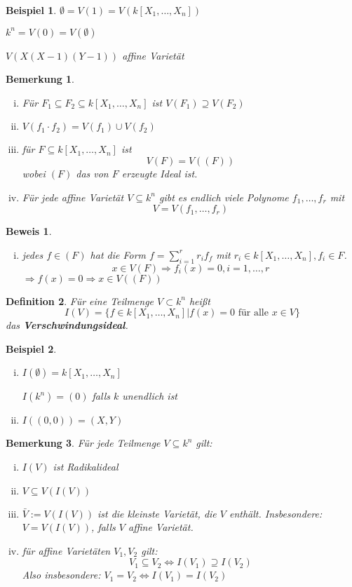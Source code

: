 \documentclass[a4paper, 12pt, numbers=noendperiod, chapterprefix=true]{scrbook}
\theoremstyle{break}
\newtheorem{Def}{Definition}[section]
\newtheorem{Bem}[Def]{Bemerkung}
\theoremstyle{nonumberbreak}
\newtheorem{nnBsp}{Beispiel}
\newtheorem{Bew}{Beweis}
\theoremstyle{nonumberplain}
\newcommand{\emp}[1]{\textbf{\emph{#1}}}
\newcommand{\deftermspec}[2]{{\index{#2}}\emp{#1}}
\begin{document}
\begin{nnBsp}
$\emptyset = V(1) = V(k[X_1,\dots ,X_n])$

$k^n = V(0) = V(\emptyset)$

$V(X(X-1)(Y-1))$ affine Variet\"at
\end{nnBsp}

\begin{Bem}\begin{enumerate}[i)]
\item F\"ur $F_1\subseteq F_2 \subseteq k[X_1,\dots ,X_n]$ ist $V(F_1)\supseteq V(F_2)$
\item $V(f_1\cdot f_2) = V(f_1) \cup V(f_2)$
\item f\"ur $F \subseteq k[X_1,\dots ,X_n]$ ist \[V(F) =V((F))\]
	wobei $(F)$ das von $F$ erzeugte Ideal ist.
\item F\"ur jede affine Variet\"at $V\subseteq k^n$ gibt es endlich viele Polynome $f_1,\dots ,f_r$ mit \[V=V(f_1,\dots ,f_r)\]
\end{enumerate}\end{Bem}

\begin{Bew}\begin{enumerate}[i)]\item[iii)]
jedes $f \in(F)$ hat die Form $f= \sum_{i=1}^r r_i f_f$ mit $r_i \in k[X_1,\dots ,X_n], f_i \in F$.\\
\[x\in V(F) \Rightarrow f_i(x)=0, i=1,\dots ,r\]
$\Rightarrow f(x)=0 \Rightarrow x\in V((F))$
\end{enumerate}\end{Bew}

\begin{Def}
F\"ur eine Teilmenge $V\subset k^n$ hei\ss t
	\[I(V)=\{f\in k[X_1,\dots ,X_n] | f(x) = 0\textrm{ f\"ur alle }x\in V\}\]
das \deftermspec{Verschwindungsideal}{Ideal!Verschwindungs-}.
\end{Def}

\begin{nnBsp}\begin{enumerate}[i)]
\item
	$I(\emptyset) = k[X_1,\dots ,X_n]$
	
	$I(k^n) =(0)$ falls $k$ unendlich ist
\item
	$I((0,0)) = (X,Y)$
\end{enumerate}\end{nnBsp}

\begin{Bem}\label{bem2.4}
F\"ur jede Teilmenge $V\subseteq k^n$ gilt:\begin{enumerate}[i)]
\item
	$I(V)$ ist Radikalideal
\item
	$V \subseteq V(I(V))$
\item
	$\bar{V} := V(I(V))$ ist die kleinste Variet\"at, die $V$ enth\"alt. Insbesondere: $V = V(I(V))$, falls $V$ affine Variet\"at.
\item\label{bem2.4.iv}
	f\"ur affine Variet\"aten $V_1,V_2$ gilt:
	\[ V_1 \subseteq V_2 \Leftrightarrow I(V_1) \supseteq I(V_2)\]
	Also insbesondere: $V_1 = V_2 \Leftrightarrow I(V_1) =I(V_2)$
\end{enumerate}\end{Bem}
\end{document}
